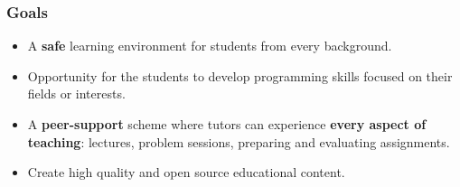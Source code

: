     \begin{frame}
      \frametitle{Goals}
      \Large
      \pause
      \begin{itemize}
        \item A \textbf{safe} learning environment for students from every background.
        \pause
        \item Opportunity for the students to develop programming skills focused on their fields or interests.
        \pause
        \item A \textbf{peer-support} scheme where tutors can experience \textbf{every aspect of teaching}: lectures, problem sessions, preparing and evaluating assignments.
        \pause
        \item Create high quality and open source educational content.
      \end{itemize}
      
    \end{frame}


